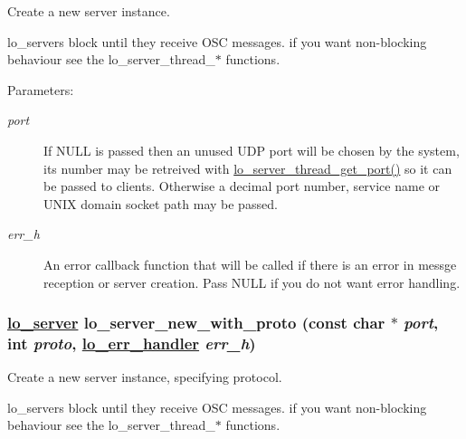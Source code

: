 Create a new server instance. 

lo\_\-servers block until they receive OSC messages. if you want non-blocking behaviour see the lo\_\-server\_\-thread\_\-$\ast$ functions.

\begin{Desc}
\item[Parameters:]
\begin{description}
\item[{\em port}]If NULL is passed then an unused UDP port will be chosen by the system, its number may be retreived with \hyperlink{group__liblo_g22f4b18eeac41490647ab9fe2333f933}{lo\_\-server\_\-thread\_\-get\_\-port()} so it can be passed to clients. Otherwise a decimal port number, service name or UNIX domain socket path may be passed. \item[{\em err\_\-h}]An error callback function that will be called if there is an error in messge reception or server creation. Pass NULL if you do not want error handling. \end{description}
\end{Desc}
\hypertarget{group__liblolowlevel_g4afa474b11ed0d4511857ae79c56aaa1}{
\subsubsection[lo\_\-server\_\-new\_\-with\_\-proto]{\setlength{\rightskip}{0pt plus 5cm}\hyperlink{lo__types_8h_59067bf50cf8abb4371da6f03c9036c9}{lo\_\-server} lo\_\-server\_\-new\_\-with\_\-proto (const char $\ast$ {\em port}, int {\em proto}, \hyperlink{lo__types_8h_6663024c5970f397af12afdb906ab9bd}{lo\_\-err\_\-handler} {\em err\_\-h})}}
\label{group__liblolowlevel_g4afa474b11ed0d4511857ae79c56aaa1}


Create a new server instance, specifying protocol. 

lo\_\-servers block until they receive OSC messages. if you want non-blocking behaviour see the lo\_\-server\_\-thread\_\-$\ast$ functions.

